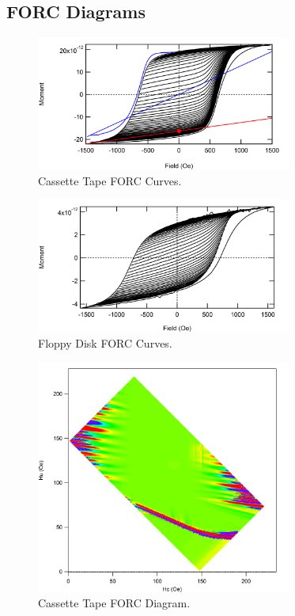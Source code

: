 \documentclass[aps,twocolumn,groupedaddress]{revtex4}
\begin{document}
\subsection{FORC Diagrams}
\begin{figure}[h]
\includegraphics[width=3.3in]{cassetteforccurves}
\caption{Cassette Tape FORC Curves.}
\label{cff}
\end{figure}
\begin{figure}[h]
\includegraphics[width=3.3in]{floppyforccurves}
\caption{Floppy Disk FORC Curves.}
\label{fff}
\end{figure}
\begin{figure}[h]
\includegraphics[width=3.3in]{cassetteforc}
\caption{Cassette Tape FORC Diagram.}
\label{cf}
\end{figure}
\end{document}
